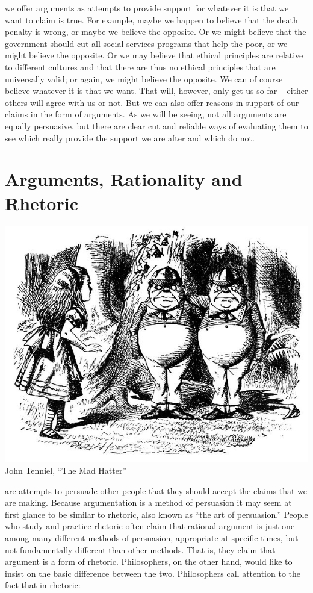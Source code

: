 \documentclass[justified]{tufte-book}
\begin{document}
 we offer arguments as attempts to provide support for whatever it is that we want to claim is true. For example, maybe we happen to believe that the death penalty is wrong, or maybe we believe the opposite. Or we might believe that the government should cut all social services programs that help the poor, or we might believe the opposite. Or we may believe that ethical principles are relative to different cultures and that there are thus no ethical principles that are universally valid; or again, we might believe the opposite. We can of course believe whatever it is that we want. That will, however, only get us so far -- either others will agree with us or not. But we can also offer reasons in support of our claims in the form of arguments. As we will be seeing, not all arguments are equally persuasive, but there are clear cut and reliable ways of evaluating them to see which really provide the support we are after and which do not.

\hypertarget{arguments-rationality-and-rhetoric}{%
\section{Arguments, Rationality and Rhetoric}\label{arguments-rationality-and-rhetoric}}

\begin{marginfigure}
\includegraphics{img/tenniel-tweedle-dee-dum.jpg} John Tenniel, ``The
Mad Hatter''
\end{marginfigure}

 are attempts to persuade other people that they should accept the claims that we are making. Because argumentation is a method of persuasion it may seem at first glance to be similar to rhetoric, also known as ``the art of persuasion.'' People who study and practice rhetoric often claim that rational argument is just one among many different methods of persuasion, appropriate at specific times, but not fundamentally different than other methods. That is, they claim that argument is a form of rhetoric. Philosophers, on the other hand, would like to insist on the basic difference between the two. Philosophers call attention to the fact that in rhetoric:
\end{document}

